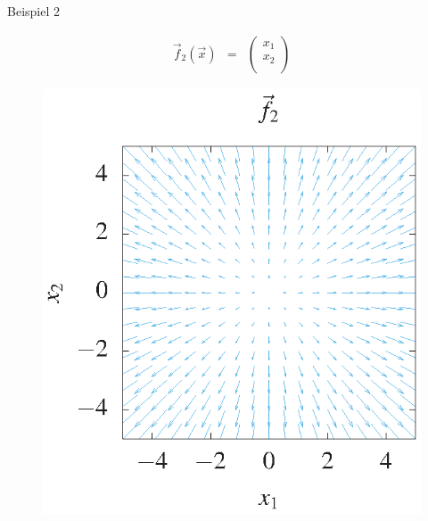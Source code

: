 \documentclass[german]{beamer}
\newcommand{\bq}{\begin{eqnarray*}}
\newcommand{\eq}{\end{eqnarray*}}
\begin{document}
\begin{frame}{Beispiel 2}

\bq
 \vec{f}_2(\vec{x}) & = & \left( \begin{array}{c} x_1 \\ x_2 \\ \end{array} \right)
\eq
\begin{figure}
\includegraphics[scale=0.7]{f2}
\end{figure}

\end{frame}
\end{document}
